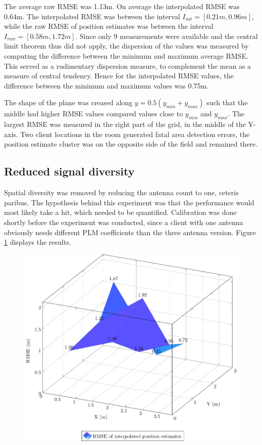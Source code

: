\documentclass[a4paper, oneside]{ipsreport}
\begin{document}
The average raw RMSE was 1.13m. On average the interpolated RMSE was 0.64m. The interpolated RMSE was between the interval $I_{int} = [0.21m, 0.96m]$, while the raw RMSE of position estimates was between the interval $I_{raw} = [0.58m, 1.72m]$. Since only 9 measurements were available and the central limit theorem thus did not apply, the dispersion of the values was measured by computing the difference between the minimum and maximum average RMSE. This served as a rudimentary dispersion measure, to complement the mean as a measure of central tendency. Hence for the interpolated RMSE values, the difference between the minimum and maximum values was 0.75m.

The shape of the plane was creased along $y=0.5(y_{min}+y_{max})$ such that the middle had higher RMSE values compared values close to $y_{min}$ and $y_{max}$. The largest RMSE was measured in the right part of the grid, in the middle of the Y-axis. Two client locations in the room generated fatal area detection errors, the position estimate cluster was on the opposite side of the field and remained there.

\subsection{Reduced signal diversity}
Spatial diversity was removed by reducing the antenna count to one, ceteris paribus. The hypothesis behind this experiment was that the performance would most likely take a hit, which needed to be quantified. Calibration was done shortly before the experiment was conducted, since a client with one antenna obviously needs different PLM coefficients than the three antenna version. Figure \ref{fig:1client} displays the results.

\begin{figure}[h]
	\centering
	\includegraphics[width=0.8\linewidth]{./figures/rmse/1client.pdf}
	\label{fig:1client}
\end{figure}
\end{document}
